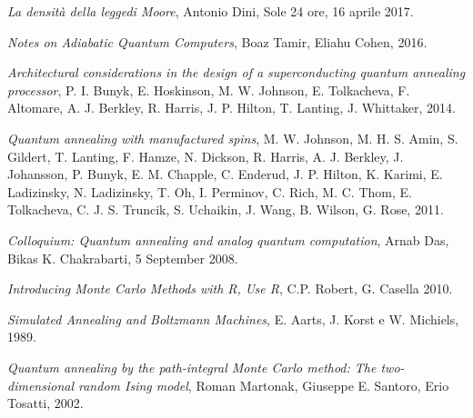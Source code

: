 \newpage
\begin{thebibliography}{99}

    \textit{La densità della leggedi Moore},
    Antonio Dini,
    Sole 24 ore,
    16 aprile 2017.

    \textit{Notes on Adiabatic Quantum Computers},
    Boaz Tamir, Eliahu Cohen,
    2016.

    \textit{Architectural considerations in the design of a superconducting quantum annealing processor},
    P. I. Bunyk, E. Hoskinson, M. W. Johnson, E. Tolkacheva, F. Altomare, A. J. Berkley, R. Harris, J. P. Hilton, T. Lanting, J. Whittaker,
    2014.

    \textit{Quantum annealing with manufactured spins},
    M. W. Johnson, M. H. S. Amin, S. Gildert, T. Lanting, F. Hamze, N. Dickson, R. Harris, A. J. Berkley, J. Johansson, P. Bunyk, E. M. Chapple, C. Enderud, J. P. Hilton, K. Karimi, E. Ladizinsky, N. Ladizinsky, T. Oh, I. Perminov, C. Rich, M. C. Thom, E. Tolkacheva, C. J. S. Truncik, S. Uchaikin, J. Wang, B. Wilson, G. Rose,
    2011.




    \textit{Colloquium: Quantum annealing and analog quantum computation},
    Arnab Das, Bikas K. Chakrabarti,
    5 September 2008.

    \textit{Introducing Monte Carlo Methods with R, Use R},
    C.P. Robert, G. Casella
    2010.

    \textit{Simulated Annealing and Boltzmann Machines},
    E. Aarts, J. Korst e W. Michiels,
    1989.

    \textit{Quantum annealing by the path-integral Monte Carlo method: The two-dimensional random Ising model},
    Roman Martonak, Giuseppe E. Santoro, Erio Tosatti,
    2002.

\end{thebibliography}
